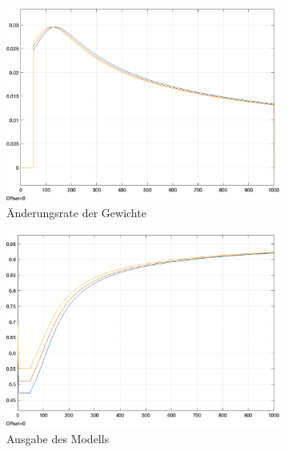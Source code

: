 \begin{figure}[h]
  \label{fig:C-EP Konvergenz Problem}
  \caption{Die Parameter des Modells gelangen zu keinem Fixpunkt und verfehlen damit das Minimum der Kostenfunktion}
  \centering
  \begin{subfigure}[b]{0.3\textwidth}
    \includegraphics[width=\textwidth]{abbildungen/c_ep_convergence_weight_update.png}
    \caption{Änderungsrate der Gewichte}
  \end{subfigure}%
  \hfill
  \begin{subfigure}[b]{0.3\textwidth}
    \includegraphics[width=\textwidth]{abbildungen/c_ep_convergence_ausgabe.png}
    \caption{Ausgabe des Modells}
  \end{subfigure}%
  \hfill
  \begin{subfigure}[b]{0.3\textwidth}

\end{subfigure}
\end{figure}
